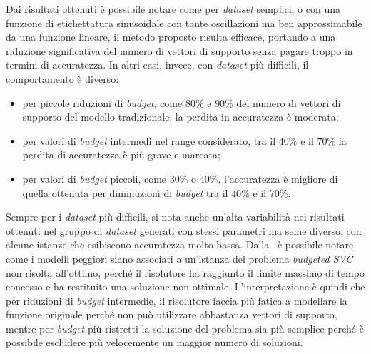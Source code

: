 Dai risultati ottenuti è possibile notare come per \emph{dataset} semplici, o con una funzione di etichettatura sinusoidale con tante oscillazioni ma ben approssimabile da una funzione lineare, il metodo proposto risulta efficace, portando a una riduzione significativa del numero di vettori di supporto senza pagare troppo in termini di accuratezza.
In altri casi, invece, con \emph{dataset} più difficili, il comportamento è diverso:
\begin{itemize}
    \item per piccole riduzioni di \emph{budget}, come $80\%$ e $90\%$ del numero di vettori di supporto del modello tradizionale, la perdita in accuratezza è moderata;
    \item per valori di \emph{budget} intermedi nel range considerato, tra il $40\%$ e il $70\%$ la perdita di accuratezza è più grave e marcata;
    \item per valori di \emph{budget} piccoli, come $30\%$ o $40\%$, l'accuratezza è migliore di quella ottenuta per diminuzioni di \emph{budget} tra il $40\%$ e il $70\%$.
\end{itemize}
Sempre per i \emph{dataset} più difficili, si nota anche un'alta variabilità nei risultati ottenuti nel gruppo di \emph{dataset} generati con stessi parametri ma seme diverso, con alcune istanze che esibiscono accuratezza molto bassa.
Dalla~ è possibile notare come i modelli peggiori siano associati a un'istanza del problema \emph{budgeted SVC} non risolta all'ottimo, perché il risolutore ha raggiunto il limite massimo di tempo concesso e ha restituito una soluzione non ottimale.
L'interpretazione è quindi che per riduzioni di \emph{budget} intermedie, il risolutore faccia più fatica a modellare la funzione originale perché non può utilizzare abbastanza vettori di supporto, mentre per \emph{budget} più ristretti la soluzione del problema sia più semplice perché è possibile escludere più velocemente un maggior numero di soluzioni.

